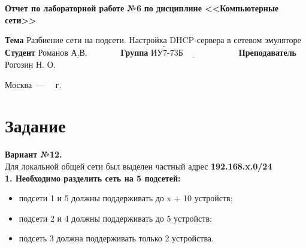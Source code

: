 \documentclass[12pt]{report}
\begin{document}
\begin{titlepage}
		\begin{center}
			\noindent\begin{minipage}{1.1\textwidth}\centering
				\Large\textbf{  Отчет по лабораторной работе №6}\newline
				\textbf{по дисциплине <<Компьютерные сети>>}\newline\newline\newline
			\end{minipage}
		\end{center}
		
		\noindent\textbf{Тема} $\underline{\text{Разбиение сети на подсети. Настройка DHCP-сервера в сетевом эмуляторе}}$\newline\newline
		\noindent\textbf{Студент} $\underline{\text{Романов А.В.~~~~~~~~~~~}}$\newline\newline
		\noindent\textbf{Группа} $\underline{\text{ИУ7-73Б~~~~~~~~~~~~~~~~~~~}}$\newline\newline
		\noindent\textbf{Преподаватель} $\underline{\text{Рогозин Н. О.}}$\newline\newline\newline
		
		\begin{center}
			\vfill
			Москва~---~\the\year
			~г.
		\end{center}
	\end{titlepage}


\section*{Задание}

\textbf{Вариант №12.}\\

Для локальной общей сети был выделен частный адрес \textbf{192.168.x.0/24}\\

\textbf{1. Необходимо разделить сеть на 5 подсетей:}

\begin{itemize}
	\item подсети 1 и 5 должны поддерживать до x + 10 устройств;
	\item подсети 2 и 4 должны поддерживать до 5 устройств;
	\item подсеть 3 должна поддерживать только 2 устройства.
\end{itemize}
\end{document}
